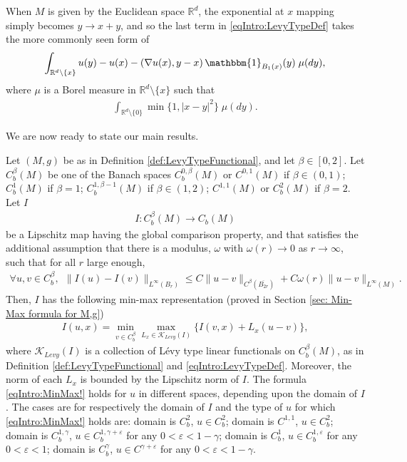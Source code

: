 \documentclass[11pt,reqno]{amsart}
\numberwithin{equation}{section}
\theoremstyle{plain}
\def\K{\mathcal K}
\def\Indicator{{\mathbbm{1}}}
\def\ep{\varepsilon}
\def\om{\omega}
\def\gam{\gamma}
\newcommand{\norm}[1]{\lVert#1\rVert}
\begin{document}
\begin{rem}
  When $M$ is given by the Euclidean space $\mathbb{R}^d$, the exponential at $x$ mapping simply becomes $y\to x+y$, and so the last term in \eqref{eqIntro:LevyTypeDef} takes the more commonly seen form of
  \begin{align*}
    \int_{\mathbb{R}^d\setminus \{x\} } u(y)-u(x)- \left ( \nabla u(x), y-x\right )\Indicator_{B_{1}(x)}(y) \;\mu(dy),
  \end{align*}	
  where $\mu$ is a Borel measure in $\mathbb{R}^d\setminus \{x\}$ such that
  \begin{align*}
    \int_{\mathbb{R}^d\setminus\{0\}} \min\{1,|x-y|^2\}\;\mu(dy).	  
  \end{align*}	  
\end{rem}
We are now ready to state our main results.
\begin{thm}\label{thm: Min-Max Riemannian Manifold}
  Let $(M,g)$ be as in Definition \ref{def:LevyTypeFunctional}, and let $\beta \in [0,2]$.
  Let $C^\beta_b(M)$ be one of the Banach spaces $C^{0,\beta}_b(M)$  or $C^{0,1}(M)$ if $\beta\in(0,1)$; $C^1_b(M)$ if $\beta=1$;  $C^{1,\beta-1}_b(M)$ if $\beta\in(1,2)$; $C^{1,1}(M)$ or $C^2_b(M)$ if $\beta=2$.  Let $I$
  \begin{align*}
    I:C^\beta_b(M)\to C_b(M)	  
  \end{align*}	  
  be a Lipschitz map having the global comparison property, and that satisfies the additional assumption that there is a modulus, $\om$ with $\om(r)\to 0$ as $r\to\infty$, such that for all $r$ large enough,
  \begin{align}\label{eqIntro:AssumptionQuatifiedLocalUnifConv1}
	  \forall u,v\in C^\beta_b,\ \ \norm{I(u)-I(v)}_{L^\infty(B_r)}
	  \leq C\norm{u-v}_{C^\beta(\overline{B_{2r}})} + C\om(r)\norm{u-v}_{L^\infty(M)}.
  \end{align}
 Then, $I$ has the following min-max representation (proved in Section \ref{sec: Min-Max formula for M,g})
  \begin{align}\label{eqIntro:MinMax!}
    I(u,x) = \min_{v\in C^\beta_b}\max_{L_x\in \K_{Levy}(I)}\{ I(v,x)+L_x(u-v)\},
  \end{align}
  where $\K_{Levy}(I)$ is a collection of L\'evy type linear functionals on $C^\beta_b(M)$, as in Definition \ref{def:LevyTypeFunctional} and \eqref{eqIntro:LevyTypeDef}. Moreover, the norm of each $L_x$ is bounded by the Lipschitz norm of $I$.  The formula \eqref{eqIntro:MinMax!} holds for $u$ in different spaces, depending upon the domain of $I$.  The cases are for respectively the domain of $I$ and the type of $u$ for which \eqref{eqIntro:MinMax!} holds are: domain is $C^2_b$, $u\in C^2_b$; domain is $C^{1,1}$, $u\in C^2_b$; domain is $C^{1,\gam}_b$, $u\in C^{1,\gam+\ep}_b$ for any $0<\ep<1-\gam$; domain is $C^1_b$, $u\in C^{1,\ep}_b$ for any $0<\ep<1$; domain is $C^\gam_b$, $u\in C^{\gam+\ep}$ for any $0<\ep<1-\gam$.
\end{thm}	
\end{document}
